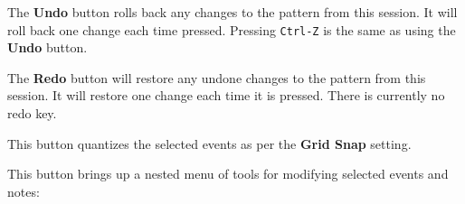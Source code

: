    \setcounter{ItemCounter}{0}      %

   The \textbf{Undo} button rolls back any changes to the pattern from this
   session.  It will roll back one change each time pressed.
   Pressing \texttt{Ctrl-Z} is the same as using the \textbf{Undo} button.

   The \textbf{Redo} button will restore any undone changes to the pattern from
   this session.
   It will restore one change each time it is pressed.
   There is currently no redo key.

   This button quantizes the selected events as per
   the \textbf{Grid Snap} setting.

   This button brings up a nested menu of tools for modifying selected
   events and notes:

